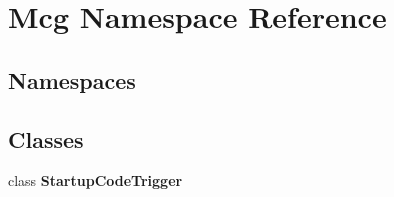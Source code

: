 \hypertarget{namespace_mcg}{}\section{Mcg Namespace Reference}
\label{namespace_mcg}
\subsection*{Namespaces}
\begin{DoxyCompactItemize}
\end{DoxyCompactItemize}
\subsection*{Classes}
\begin{DoxyCompactItemize}
\item 
class {\bfseries Startup\+Code\+Trigger}
\end{DoxyCompactItemize}
